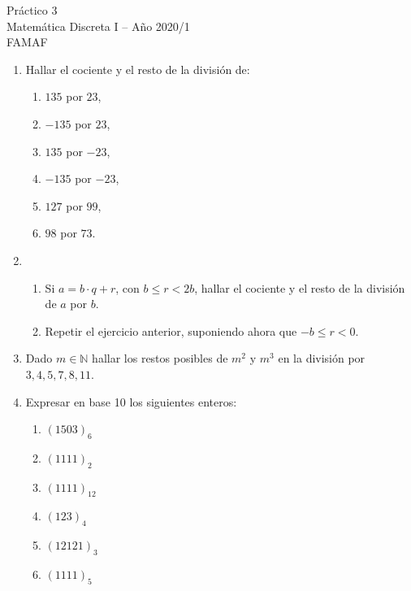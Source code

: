 \documentclass[12pt,spanish,makeidx]{amsbook}
\begin{document}
{\bf \begin{center} Práctico 3 \\ Matemática Discreta I -- Año 2020/1 \\ FAMAF \end{center}}

\smallskip


\begin{enumerate}


\smallskip

\item Hallar el cociente y el resto de la división de:

\begin{multicols}{3}
\begin{enumerate}
  \item $135$ por $23$,
	\item $-135$ por $23$,
	\item $135$ por $-23$,
  \item $-135$ por $-23$,
	\item $127$ por $99$,
	\item $98$ por $73$.
\end{enumerate}
\end{multicols}

\smallskip

\item 
\begin{enumerate}
  \item Si $a=b\cdot q+r$, con $b \le r <2 b$, hallar el cociente y el resto de la división de $a$ por $b$.
  \item Repetir el ejercicio anterior, suponiendo ahora que $-b \le r < 0$.
\end{enumerate}


\smallskip
\item Dado $m\in \mathbb N$ hallar los restos posibles de $m^2$ y $m^3$ en la división por $3,4,5,7,8, 11$.

\smallskip
\item Expresar en base 10 los siguientes enteros:
\begin{multicols}{3}
\begin{enumerate}
	\item $(1503)_6$ 
	\item $(1111)_2$ 
	\item $(1111)_{12}$
	\item $(123)_4$ 
	\item $(12121)_3$
	\item $(1111)_5$
\end{enumerate}
\end{multicols}


\end{enumerate}
\end{document}
